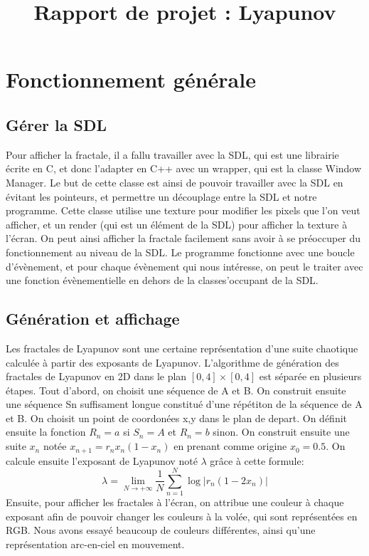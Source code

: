 \documentclass{article}
\title{Rapport de projet : Lyapunov}
\date{}
\begin{document}
	\vspace*{-2pt}
	{\let\newpage\relax\maketitle} \thispagestyle{fancy}

	\section{Fonctionnement générale}
	\subsection{Gérer la SDL}
	Pour afficher la fractale, il a fallu travailler avec la SDL, qui est une librairie écrite en C, et donc l'adapter en C++ avec un wrapper, qui est la classe Window Manager.
	Le but de cette classe est ainsi de pouvoir travailler avec la SDL en évitant les pointeurs, et permettre un découplage entre la SDL et notre programme.
	Cette classe utilise une texture pour modifier les pixels que l'on veut afficher, et un render (qui est un élément de la SDL) pour afficher la texture à l'écran.
	On peut ainsi afficher la fractale facilement sans avoir à se préoccuper du fonctionnement au niveau de la SDL.
	Le programme fonctionne avec une boucle d'évènement, et pour chaque évènement qui nous intéresse, on peut le traiter avec une fonction évènementielle en dehors de la classes'occupant de la SDL.

	\subsection{Génération et affichage}
	Les fractales de Lyapunov sont une certaine représentation d'une suite chaotique calculée à partir des exposants de Lyapunov.
	L'algorithme de génération des fractales de Lyapunov en 2D dans le plan $[0,4] \times [0,4]$ est séparée en plusieurs étapes.
    Tout d'abord, on choisit une séquence de A et B.
	On construit ensuite une séquence Sn suffisament longue constitué d'une répétiton de la séquence de A et B.
	On choisit un point de coordonées x,y dans le plan de depart.
	On définit ensuite la fonction $R_n = a$ si $ S_n = A $ et $R_n = b$ sinon.
	On construit ensuite une suite $x_n$ notée $x_{{n+1}}=r_{n}x_{n}(1-x_{n})$ en prenant comme origine $x_0 = 0.5$.
	On calcule ensuite l'exposant de Lyapunov noté $\lambda$ grâce à cette formule:
	\[
		\lambda = \lim_{N \to +\infty} \frac{1}{N} \sum_{n=1}^{N} \log | r_n(1-2x_n) |
	\]
    Ensuite, pour afficher les fractales à l'écran, on attribue une couleur à chaque exposant afin de pouvoir changer les couleurs à la volée, qui sont représentées en RGB.
    Nous avons essayé beaucoup de couleurs différentes, ainsi qu'une représentation arc-en-ciel en mouvement.
\end{document}
